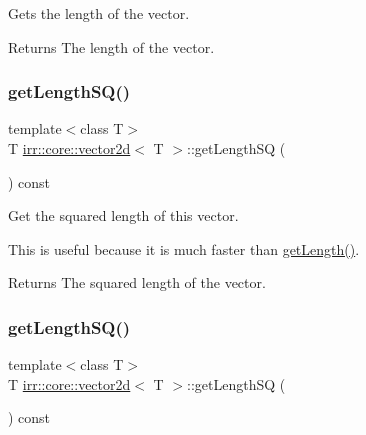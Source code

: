 Gets the length of the vector. 

\begin{DoxyReturn}{Returns}
The length of the vector. 
\end{DoxyReturn}
\mbox{\label{classirr_1_1core_1_1vector2d_ac08fae4770172d11cb2811f18fec2d23}} 
\subsubsection{\texorpdfstring{get\+Length\+S\+Q()}{getLengthSQ()}\hspace{0.1cm}{\footnotesize\ttfamily [1/2]}}
{\footnotesize\ttfamily template$<$class T$>$ \\
T \hyperlink{classirr_1_1core_1_1vector2d}{irr\+::core\+::vector2d}$<$ T $>$\+::get\+Length\+SQ (\begin{DoxyParamCaption}{ }\end{DoxyParamCaption}) const\hspace{0.3cm}{\ttfamily [inline]}}



Get the squared length of this vector. 

This is useful because it is much faster than \hyperlink{classirr_1_1core_1_1vector2d_a84b5741d21aa24cfb71b14e350226ab9}{get\+Length()}. \begin{DoxyReturn}{Returns}
The squared length of the vector. 
\end{DoxyReturn}
\mbox{\label{classirr_1_1core_1_1vector2d_ac08fae4770172d11cb2811f18fec2d23}} 
\subsubsection{\texorpdfstring{get\+Length\+S\+Q()}{getLengthSQ()}\hspace{0.1cm}{\footnotesize\ttfamily [2/2]}}
{\footnotesize\ttfamily template$<$class T$>$ \\
T \hyperlink{classirr_1_1core_1_1vector2d}{irr\+::core\+::vector2d}$<$ T $>$\+::get\+Length\+SQ (\begin{DoxyParamCaption}{ }\end{DoxyParamCaption}) const\hspace{0.3cm}{\ttfamily [inline]}}



